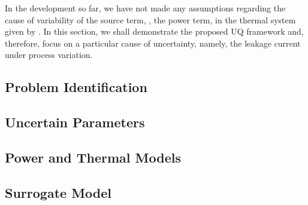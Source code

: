 In the development so far, we have not made any assumptions regarding the cause of variability of the source term, \ie, the power term, in the thermal system given by . In this section, we shall demonstrate the proposed UQ framework and, therefore, focus on a particular cause of uncertainty, namely, the leakage current under process variation.

\subsection{Problem Identification} 


\subsection{Uncertain Parameters} 


\subsection{Power and Thermal Models}  


\subsection{Surrogate Model} 

